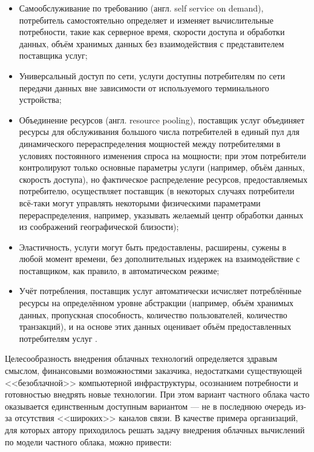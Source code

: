 \documentclass[10pt, a5paper]{article}
\begin{document}
\begin{itemize}
  \item Самообслуживание по требованию (англ. self service on \linebreak demand), потребитель самостоятельно определяет и изменяет вычислительные потребности, такие как серверное время, скорости доступа и обработки данных, объём хранимых данных без взаимодействия с представителем поставщика услуг;
  \item Универсальный доступ по сети, услуги доступны потребителям по сети передачи данных вне зависимости от используемого терминального устройства;
  \item Объединение ресурсов (англ. resource pooling), поставщик \linebreak услуг объединяет ресурсы для обслуживания большого числа потребителей в единый пул для динамического перераспределения мощностей между потребителями в условиях постоянного изменения спроса на мощности; при этом потребители контролируют только основные параметры услуги (например, объём данных, скорость доступа), но фактическое распределение ресурсов, предоставляемых потребителю, осуществляет поставщик (в некоторых случаях потребители всё-таки могут управлять некоторыми физическими параметрами перераспределения, например, указывать желаемый центр обработки данных из соображений географической близости);
  \item Эластичность, услуги могут быть предоставлены, расширены, сужены в любой момент времени, без дополнительных издержек на взаимодействие с поставщиком, как правило, в автоматическом режиме;
  \item Учёт потребления, поставщик услуг автоматически исчисляет потреблённые ресурсы на определённом уровне абстракции (например, объём хранимых данных, пропускная способность, количество пользователей, количество транзакций), и на основе этих данных оценивает объём предоставленных потребителям услуг \cite{Vankevich1}.
\end{itemize}

Целесообразность внедрения облачных технологий определяется здравым смыслом, финансовыми возможностями заказчика, недостатками существующей <<безоблачной>> компьютерной инфраструктуры, осознанием потребности и готовностью внедрять новые технологии. При этом вариант частного облака часто оказывается единственным доступным вариантом --- не в последнюю очередь из-за отсутствия <<широких>> каналов связи. В качестве примера организаций, для которых автору приходилось решать задачу внедрения облачных вычислений по модели частного облака, можно привести:
\end{document}
